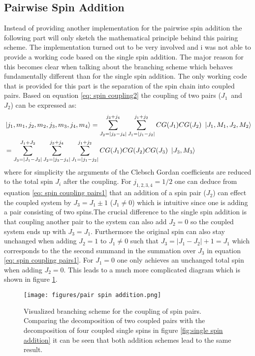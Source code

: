 \documentclass{scrartcl}
\begin{document}
\subsection{Pairwise Spin Addition}
Instead of providing another implementation for the pairwise spin addition the following part will only sketch the mathematical principle behind this pairing scheme. The implementation turned out to be very involved and i was not able to provide a working code based on the single spin addition. The major reason for this becomes clear when talking about the branching scheme which behaves fundamentally different than for the single spin addition. The only working code that is provided for this part is the separation of the spin chain into coupled pairs. Based on equation \ref{eq: spin coupling2} the coupling of two pairs ($J_1$~and~$J_2$) can be expressed as:
\begin{equation}
\begin{aligned}
    \hspace{-0.5cm}&\ket{j_1,m_1,j_2,m_2,j_3,m_3,j_4,m_4}=  \sum^{j_3+j_4}_{J_2=|j_3-j_4|} \sum^{j_1+j_2}_{J_1=|j_1-j_2|} CG(J_1) CG(J_2) \ \ket{J_1, M_1,J_2,M_2} \\
    &= \sum^{J_1+J_2}_{J_3=|J_1-J_2|}  \sum^{j_3+j_4}_{J_2=|j_3-j_4|} \sum^{j_1+j_2}_{J_1=|j_1-j_2|} CG(J_1) CG(J_2) CG(J_3) \ \ket{J_3,M_3}
    \label{eq: spin coupling pairs1}
\end{aligned}
\end{equation}
where for simplicity the arguments of the Clebsch Gordan coefficients are reduced to the total spin $J_i$ after the coupling. For $j_{1,2,3,4}=1/2$ one can deduce from equation \ref{eq: spin coupling pairs1} that an addition of a spin pair ($J_2$) can effect the coupled system by $J_3=J_1\pm1$ ($J_1\neq0$) which is intuitive since one is adding a pair consisting of two spins.\newpage \noindent The crucial difference to the single spin addition is that coupling another pair to the system can also add $J_2=0$ so the coupled system ends up with $J_3=J_1$. Furthermore the original spin can also stay unchanged when adding $J_2=1$ to $J_1\neq0$ such that $J_3=|J_1-J_2|+1=J_1$ which corresponds to the the second summand in the summation over $J_3$ in equation \ref{eq: spin coupling pairs1}. For $J_1=0$ one only achieves an unchanged total spin when adding $J_2=0$. This leads to a much more complicated diagram which is shown in figure \ref{fig:pairwis spin addition}.

\begin{figure}[htbp]
    \centering
    \texttt{[image: figures/pair spin addition.png]}
    \caption{Visualized branching scheme for the coupling of spin pairs. Comparing the decomposition of two coupled pairs with the decomposition of four coupled single spins in figure \ref{fig:single spin addition} it can be seen that both addition schemes lead to the same result.}
    \label{fig:pairwis spin addition}
\end{figure}
\FloatBarrier
\end{document}
